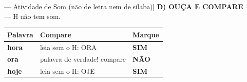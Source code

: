 \begin{exercicio}[Som H mudo [sem som] --- Atividade de Som (não de letra nem de sílaba)]
\textbf{D) OUÇA E COMPARE} --- H não tem som.

\begin{center}
\begin{tabular}{@{}p{4.2cm}p{6.2cm}p{1.6cm}@{}}
\hline
\textbf{Palavra} & \textbf{Compare} & \textbf{Marque} \\
\hline
\textbf{hora} & leia sem o H: ORA & \textbf{SIM} \\
\textbf{ora} & palavra de verdade! compare & \textbf{NÃO} \\
\textbf{hoje} & leia sem o H: OJE & \textbf{SIM} \\
\hline
\end{tabular}
\end{center}

\end{exercicio}
